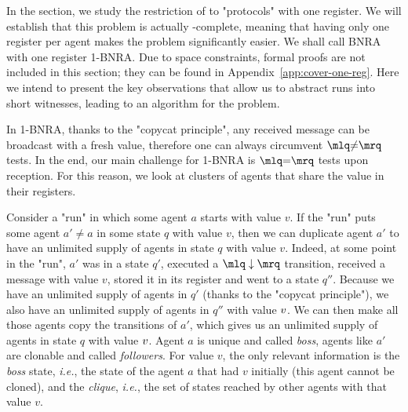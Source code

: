 	In the section, we study the restriction of \COVER to "protocols" with one register. We will establish that this problem is actually \NP-complete, meaning that having only one register per agent makes the problem significantly easier. 
	We shall call BNRA with one register 1-BNRA. Due to space constraints, formal proofs are not included in this section; they can be found in Appendix~\ref{app:cover-one-reg}. Here we intend to present the key observations that allow us to abstract runs into short witnesses, leading to an \NP algorithm for the problem.
	
	In 1-BNRA, thanks to the "copycat principle", any received message can be broadcast with a fresh value, therefore one can always circumvent $\quotemarks{\diseqtestact}$ tests. In the end, our main challenge for 1-BNRA is $\quotemarks{\eqtestact}$ tests upon reception.
	For this reason, we look at clusters of agents that share the value in their registers. 

	Consider a "run" in which some agent $a$ starts with value $v$. 
	If the "run" puts some agent $a' \ne a$ in some state $q$ with value $v$, then we can duplicate agent $a'$ to have an unlimited supply of agents in state $q$ with value $v$. 
	Indeed, at some point in the "run", $a'$ was in a state $q'$, executed a $\quotemarks{\enregact}$ transition, received a message with value $v$, stored it in its register and went to a state $q''$. 
	Because we have an unlimited supply of agents in $q'$ (thanks to the "copycat principle"), we also have an unlimited supply of agents in $q''$ with value $v$. 
	We can then make all those agents copy the transitions of $a'$, which gives us an unlimited supply of agents in state $q$ with value $v$. Agent $a$ is unique and called \emph{boss}, agents like $a'$ are clonable and called \emph{followers}. For value $v$, the only relevant information is the \emph{boss} state, \emph{i.e.}, the state of the agent $a$ that had $v$ initially (this agent cannot be cloned), and the \emph{clique}, \emph{i.e.}, the set of states reached by other agents with that value $v$. 

